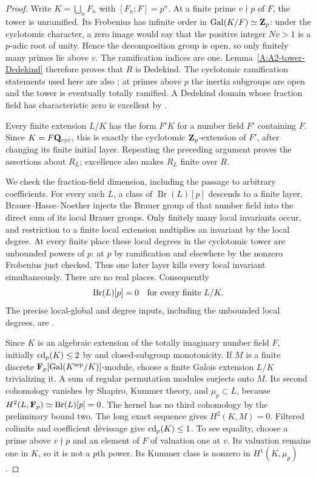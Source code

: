 \begin{proof}
Write $K=\bigcup_n F_n$ with $[F_n:F]=p^n$. At a finite prime
$v\nmid p$ of $F$, the tower is unramified. Its Frobenius has infinite
order in $\operatorname{Gal}(K/F)\simeq\mathbf Z_p$: under the cyclotomic
character, a zero image would say that the positive integer $Nv>1$ is
a $p$-adic root of unity. Hence the decomposition group is open, so
only finitely many primes lie above $v$. The ramification indices are
one. Lemma~\ref{A:A2-tower-Dedekind} therefore proves that $R$ is
Dedekind. The cyclotomic ramification statements used here are also
\citet[Proposition 11.1.1]{A_NSW}; at primes above $p$ the inertia
subgroups are open and the tower is eventually totally ramified.
A Dedekind domain whose fraction field has characteristic zero is
excellent by \citet[Proposition 15.53.3(4), Tag 07QS]{A_Stacks}.

Every finite extension $L/K$ has the form $F'K$ for a number field
$F'$ containing $F$. Since $K=F\mathbf Q_{\mathrm{cyc}}$, this is exactly
the cyclotomic $\mathbf Z_p$-extension of $F'$, after changing its finite
initial layer. Repeating the preceding argument proves the assertions
about $R_L$; excellence also makes $R_L$ finite over $R$.

We check the fraction-field dimension, including the passage to arbitrary
coefficients. For every such $L$, a class of $\operatorname{Br}(L)[p]$
descends to a finite layer. Brauer--Hasse--Noether injects the Brauer
group of that number field into the direct sum of its local Brauer
groups. Only finitely many local invariants occur, and restriction to
a finite local extension multiplies an invariant by the local degree.
At every finite place these local degrees in the cyclotomic tower are
unbounded powers of $p$: at $p$ by ramification and elsewhere by the
nonzero Frobenius just checked. Thus one later layer kills every local
invariant simultaneously. There are no real places. Consequently
\[
 \operatorname{Br}(L)[p]=0
 \quad\hbox{for every finite }L/K.
\]
The precise local-global and degree inputs, including the unbounded
local degrees, are \citet[Chapter VII, Theorem 7.1, Proposition 7.2,
and the proof of Lemma 7.3]{A_MilneCFT}.

Since $K$ is an algebraic extension of the totally imaginary number
field $F$, initially $\operatorname{cd}_p(K)\leq2$ by \citet[Proposition 8.3.18, taking all primes in $S$]{A_NSW} and closed-subgroup monotonicity. If $M$ is a finite discrete
$\mathbf F_p[\operatorname{Gal}(K^{\mathrm{sep}}/K)]$-module, choose a finite
Galois extension $L/K$ trivializing it. A sum of regular permutation
modules surjects onto $M$. Its second cohomology vanishes by Shapiro,
Kummer theory, and $\mu_p\subset L$, because
$H^2(L,\mathbf F_p)\simeq\operatorname{Br}(L)[p]=0$.
The kernel has no third cohomology by the preliminary bound two.
The long exact sequence gives $H^2(K,M)=0$. Filtered colimits and
coefficient d\'evissage give $\operatorname{cd}_p(K)\leq1$. To see equality, choose
a prime above $v\nmid p$ and an element of $F$ of valuation one at $v$.
Its valuation remains one in $K$, so it is not a $p$th power. Its Kummer
class is nonzero in $H^1(K,\mu_p)$.


\end{proof}
